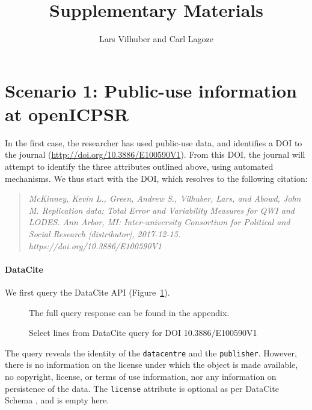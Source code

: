 \documentclass[10pt,letterpaper]{article}
\author{Lars Vilhuber and Carl Lagoze}
\title{Supplementary Materials}
\begin{document}
	\maketitle
	
\section{Scenario 1: Public-use information at openICPSR}
In the first case, the researcher has  used public-use data, and identifies a \ac{DOI} to the journal (\url{http://doi.org/10.3886/E100590V1}). From this \ac{DOI}, the journal will attempt to identify the three attributes outlined above, using automated mechanisms. We thus start with the \ac{DOI}, which resolves to the following citation:

\begin{quote}
	\it
	McKinney, Kevin L., Green, Andrew S., Vilhuber, Lars, and Abowd, John M. Replication data: Total Error and Variability Measures for QWI and LODES. Ann Arbor, MI: Inter-university Consortium for Political and Social Research [distributor], 2017-12-15. https://doi.org/10.3886/E100590V1
\end{quote}


\paragraph{DataCite}

We first query the DataCite API (Figure~\ref{fig:case1:datacite}).
\begin{figure}
	\singlespacing
	
	
	
	
	
	
	\caption{Select lines from DataCite query for DOI 10.3886/E100590V1}
	\label{fig:case1:datacite}
	\centering \footnotesize The full query response can be found in the appendix.
\end{figure}
%
The query reveals the identity of the \texttt{datacentre} and the \texttt{publisher}. However, there is no information on the license under which the object is made available, no copyright, license, or terms of use information, nor any information on persistence of the data. The \texttt{license} attribute is optional as per DataCite Schema \parencite{DataCiteMetadataWorkingGroupDataCiteMetadataSchema2017}, and is empty here.
\end{document}
